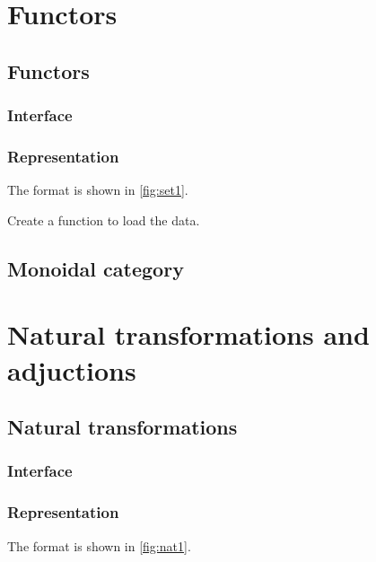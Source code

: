 \chapter{Functors}


\section{Functors}

\subsection*{Interface}

\subsection*{Representation}
The format is shown in \cref{fig:set1}.




\begin{exercise}
Create a function to load the data.
%
\end{exercise}


\section{Monoidal category}


\chapter{Natural transformations and adjuctions}


\section{Natural transformations}

\subsection*{Interface}

\subsection*{Representation}
The format is shown in \cref{fig:nat1}.



